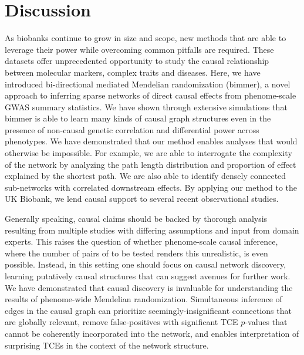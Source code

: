 \documentclass{article}
\begin{document}
\section{Discussion}\label{discussion}
As biobanks continue to grow in size and scope, new methods that are able to
leverage their power while overcoming common pitfalls are required.
These datasets offer unprecedented opportunity to study
the causal relationship between molecular markers, complex traits and diseases.
Here, we have introduced bi-directional mediated Mendelian randomization (bimmer),
a novel approach to inferring sparse networks of direct causal effects from phenome-scale
GWAS summary statistics. We have shown through extensive simulations that
bimmer is able to learn many kinds of causal graph structures even in the presence
of non-causal genetic correlation and differential power across phenotypes.
We have demonstrated that our method enables analyses that would otherwise be impossible. For example, 
we are able to interrogate the complexity of the network by analyzing the path length
distribution and proportion of effect explained by the shortest path. We are also able to 
identify densely connected sub-networks with correlated downstream effects. By applying our
method to the UK Biobank, we lend causal support to several recent observational studies.

Generally speaking, causal claims should be backed by thorough analysis resulting from
multiple studies with differing assumptions and input from domain experts. This raises the question
of whether phenome-scale causal inference, where the number of pairs of to be tested
renders this unrealistic, is even possible. Instead, in this setting one should focus on
causal network discovery, learning putatively causal structures that can suggest avenues for further
work. We have demonstrated that causal discovery is invaluable for understanding
the results of phenome-wide Mendelian randomization. Simultaneous inference of edges in
the causal graph can prioritize seemingly-insignificant connections that are globally relevant,
remove false-positives with significant TCE $p$-values that
cannot be coherently incorporated into the network, and enables interpretation of
 surprising TCEs in the context of the network structure.
\end{document}
